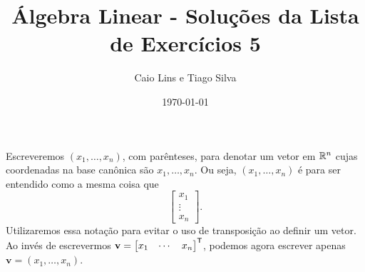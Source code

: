 \documentclass[leqno]{article}
\title{Álgebra Linear - Soluções da Lista de Exercícios 5}
\author{Caio Lins e Tiago Silva}
\date{\today}
\numberwithin{equation}{section}
\newcommand{\bfv}{\mathbf{v}}
\begin{document}
\maketitle

\begin{rem*}
    Escreveremos \( ( x_{ 1 }, \dots, x_{ n } ) \), com parênteses, para denotar um vetor em \( \mathbb{R}^{ n } \) cujas coordenadas na base canônica são \( x_{ 1 }, \dots, x_{ n } \).
    Ou seja, \( ( x_{ 1 }, \dots, x_{ n } ) \) é para ser entendido como a mesma coisa que
    \begin{equation*}
        \begin{bmatrix}
            x_{ 1 } \\
            \vdots \\
            x_{ n }
        \end{bmatrix}
    .\end{equation*}
    Utilizaremos essa notação para evitar o uso de transposição ao definir um vetor.
    Ao invés de escrevermos \( \bfv =
    \begin{bmatrix}
        x_{ 1 } & \cdots & x_{ n }
    \end{bmatrix}^{ \transpose }\), podemos agora escrever apenas \( \bfv = ( x_{ 1 }, \dots, x_{ n } ) \).
\end{rem*}
\end{document}
